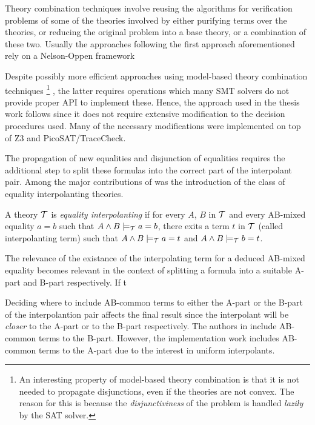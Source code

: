 Theory combination techniques involve 
reusing the algorithms for verification 
problems of some of the theories involved 
by either purifying terms over the 
theories, or reducing the original problem 
into a base theory, or a combination of these two. 
Usually the approaches following the first approach 
aforementioned rely on a Nelson-Oppen
framework \cite{10.1007/11532231_26, 
10.1007/978-3-642-22119-4_1, 10.1145/2490253}

Despite possibly more efficient approaches using
model-based theory combination techniques 
\footnote{
  An interesting property of model-based theory combination 
  is that it is not needed to propagate disjunctions, even if
  the theories are not convex. The reason for this is because
  the \emph{disjunctiviness} of the problem is handled 
  \emph{lazily} by the
  SAT solver.
} \cite{10.1007/978-3-642-22119-4_1}, the latter requires 
operations which many SMT solvers do not provide 
proper API to implement these.
Hence, the approach used in the thesis work follows 
\cite{10.1007/11532231_26} since it does not require extensive
modification to the decision procedures
used. Many of the necessary modifications 
were implemented on top of Z3 and PicoSAT/TraceCheck.

The propagation of new equalities and disjunction of equalities
requires the additional step to split these formulas into
the correct part of the interpolant pair. Among the major
contributions of \cite{10.1007/11532231_26} was the introduction
of the class of equality interpolanting theories.

\begin{definition}
  A theory $\cal{T}$ is \emph{equality interpolanting}
  if for every $A$, $B$ in $\cal{T}$ and every AB-mixed
  equality $a = b$ such that $A \land B \models_{\cal{T}} a = b$,
  there exits a term $t$
  in $\cal{T}$ (called interpolanting term)
  such that $A \land B \models_{\cal{T}} a = t$ and 
  $A \land B \models_{\cal{T}} b = t$.
\end{definition}

The relevance of the existance of the interpolating term for 
a deduced AB-mixed equality becomes relevant in the context 
of splitting a formula into a suitable A-part and B-part 
respectively. If t

Deciding where to include AB-common terms to either the 
A-part or the B-part of the interpolantion pair affects 
the final result since the interpolant will be \emph{closer} 
to the A-part or to the B-part respectively. The authors in 
\cite{10.1007/11532231_26} include AB-common terms to the B-part. 
However, the implementation work includes AB-common terms to the
A-part due to the interest in uniform interpolants.

